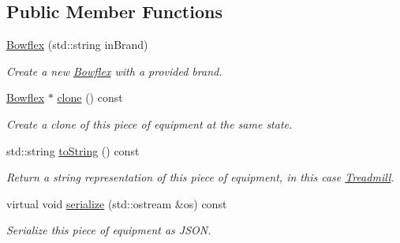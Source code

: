 \subsection*{Public Member Functions}
\begin{DoxyCompactItemize}
\item 
\hypertarget{class_bowflex_a10b7274af9e6835b12ec58cb61d39eac}{}\hyperlink{class_bowflex_a10b7274af9e6835b12ec58cb61d39eac}{Bowflex} (std\+::string in\+Brand)\label{class_bowflex_a10b7274af9e6835b12ec58cb61d39eac}

\begin{DoxyCompactList}\small\item\em Create a new \hyperlink{class_bowflex}{Bowflex} with a provided brand. \end{DoxyCompactList}\item 
\hypertarget{class_bowflex_a39d1bae9773c36a0800f1dfef1de9404}{}\hyperlink{class_bowflex}{Bowflex} $\ast$ \hyperlink{class_bowflex_a39d1bae9773c36a0800f1dfef1de9404}{clone} () const \label{class_bowflex_a39d1bae9773c36a0800f1dfef1de9404}

\begin{DoxyCompactList}\small\item\em Create a clone of this piece of equipment at the same state. \end{DoxyCompactList}\item 
\hypertarget{class_bowflex_a31980655a56dcf5446d138f9beb3606b}{}std\+::string \hyperlink{class_bowflex_a31980655a56dcf5446d138f9beb3606b}{to\+String} () const \label{class_bowflex_a31980655a56dcf5446d138f9beb3606b}

\begin{DoxyCompactList}\small\item\em Return a string representation of this piece of equipment, in this case \textquotesingle{}\hyperlink{class_treadmill}{Treadmill}\textquotesingle{}. \end{DoxyCompactList}\item 
\hypertarget{class_bowflex_a5246901c7ecc848a7db8630def1755bf}{}virtual void \hyperlink{class_bowflex_a5246901c7ecc848a7db8630def1755bf}{serialize} (std\+::ostream \&os) const \label{class_bowflex_a5246901c7ecc848a7db8630def1755bf}

\begin{DoxyCompactList}\small\item\em Serialize this piece of equipment as J\+S\+O\+N. \end{DoxyCompactList}\end{DoxyCompactItemize}
